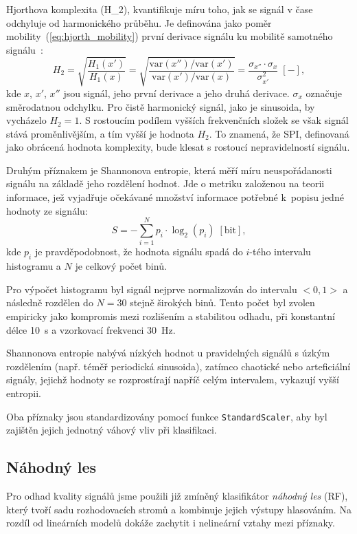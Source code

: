 Hjorthova komplexita (\acs{H_2}), kvantifikuje míru toho, jak se signál v čase odchyluje od harmonického průběhu.
Je definována jako poměr mobility~(\ref{eq:hjorth_mobility}) první derivace signálu ku mobilitě samotného signálu~\cite{Hjorth1970,Geetika2022}:
\begin{equation}
	\label{eq:hjorth_complexity}
	H_{2} = \sqrt{ \frac{H_1(x')}{H_1(x)} }
	= \sqrt{ \frac{ \text{var}(x'') / \text{var}(x') }{ \text{var}(x') / \text{var}(x) } }
	= \frac{ \sigma_{x''} \cdot \sigma_{x} }{ \sigma_{x'}^2 } \; [-],
\end{equation}
kde $x$, $x'$, $x''$ jsou signál, jeho první derivace a jeho druhá derivace.
$\sigma_x$ označuje směrodatnou odchylku.
Pro čistě harmonický signál, jako je sinusoida, by vycházelo $H_2 = 1$.
S rostoucím podílem vyšších frekvenčních složek se však signál stává proměnlivějším, a tím vyšší je hodnota \( H_2 \).
To znamená, že \acs{SPI}, definovaná jako obrácená hodnota komplexity, bude klesat s rostoucí nepravidelností signálu.

Druhým příznakem je Shannonova entropie, která měří míru neuspořádanosti signálu na základě jeho rozdělení hodnot.
Jde o metriku založenou na teorii informace, jež vyjadřuje očekávané množství informace potřebné k~popisu jedné hodnoty ze signálu:
\begin{equation}
	\label{eq:shannon_entropy}
	S = - \sum_{i=1}^{N} p_i \cdot \log_2(p_i) \; [\text{bit}],
\end{equation}
kde $p_i$ je pravděpodobnost, že hodnota signálu spadá do $i$-tého intervalu histogramu a $N$ je celkový počet binů.

Pro výpočet histogramu byl signál nejprve normalizován do intervalu $< 0, 1 >$ a následně rozdělen do $N = 30$ stejně širokých binů.
Tento počet byl zvolen empiricky jako kompromis mezi rozlišením a stabilitou odhadu, při konstantní délce 10~s a vzorkovací frekvenci 30~Hz.

Shannonova entropie nabývá nízkých hodnot u pravidelných signálů s úzkým rozdělením (např. téměř periodická sinusoida),
zatímco chaotické nebo arteficiální signály, jejichž hodnoty se rozprostírají napříč celým intervalem, vykazují vyšší entropii.

Oba příznaky jsou standardizovány pomocí funkce \texttt{StandardScaler}, aby byl zajištěn jejich jednotný váhový vliv při klasifikaci.

\subsection*{Náhodný les}
\label{subsec:random_forest}
Pro odhad kvality signálů jsme použili již zmíněný klasifikátor \emph{náhodný les} (\acs{RF}), který tvoří sadu rozhodovacích stromů a kombinuje jejich výstupy hlasováním.
Na rozdíl od lineárních modelů dokáže zachytit i nelineární vztahy mezi příznaky.

